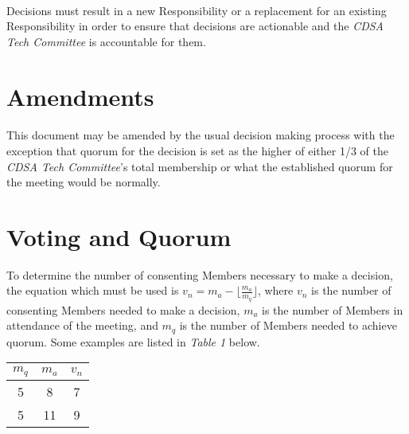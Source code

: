 \documentclass[12pt,letter,twocolumn,oneside,draft]{article}
\newcommand{\cname}{\emph{CDSA Tech Committee}}
\begin{document}
\paragraph{}
Decisions must result in a new Responsibility or a replacement for an existing
Responsibility in order to ensure that decisions are actionable and the
\cname{} is accountable for them.


\section{Amendments}

\paragraph{}
This document may be amended by the usual decision making process with the
exception that quorum for the decision is set as the higher of either 1/3 of
the \cname{}'s total membership or what the established quorum for the meeting
would be normally.

\pagebreak

\appendix

\onecolumn
\section{Voting and Quorum}

To determine the number of consenting Members necessary to make a decision, the
equation which must be used is
\( v_{n} = m_{a} - \lfloor \frac{m_{a}}{m_{q}} \rfloor \),
where $v_{n}$ is the number of consenting Members needed to make a decision,
$m_{a}$ is the number of Members in attendance of the meeting, and $m_{q}$ is
the number of Members needed to achieve quorum. Some examples are listed in
\emph{Table 1} below.

 \label{tab:title} 
\begin{tabular}{| c | c | c |}
    \hline
    $m_{q}$ & $m_{a}$ & $v_{n}$ \\
    \hline
    5 & 8 & 7 \\
    \hline
    5 & 11 & 9 \\
    \hline
\end{tabular}
\end{document}
